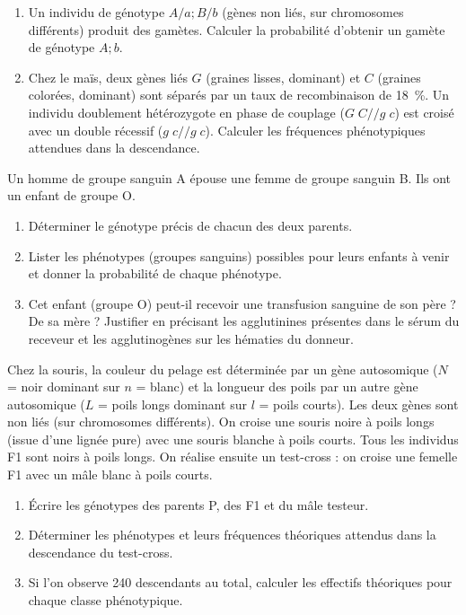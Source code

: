\documentclass[11pt]{article}
\newcommand{\cle}[1]{{\popxbold\color{popdark}#1}}
\newcounter{popsec}
\newcounter{popsub}
\newcommand{\courssub}[1]{%
  \stepcounter{popsub}%
  \par\vspace{9pt}\noindent{\popxbold\fontsize{11.5}{13}\selectfont\color{popink}{\color{poporange}\thepopsec.\thepopsub}\hspace{6pt}#1}\par\nopagebreak\vspace{4pt}
}
\begin{document}
\begin{exercice}
\begin{enumerate}
    \item Un individu de génotype $A/a ; B/b$ (gènes non liés, sur chromosomes différents) produit des gamètes. Calculer la probabilité d'obtenir un gamète de génotype $A ; b$.
    \item Chez le maïs, deux gènes liés $G$ (graines lisses, dominant) et $C$ (graines colorées, dominant) sont séparés par un taux de recombinaison de \SI{18}{\percent}. Un individu doublement hétérozygote en \cle{phase de couplage} ($G\;C // g\;c$) est croisé avec un double récessif ($g\;c // g\;c$). Calculer les fréquences phénotypiques attendues dans la descendance.
\end{enumerate}
\end{exercice}

\courssub{Je m'entraîne}

\begin{exercice}
Un homme de groupe sanguin A épouse une femme de groupe sanguin B. Ils ont un enfant de groupe O.
\begin{enumerate}
    \item Déterminer le génotype précis de chacun des deux parents.
    \item Lister les phénotypes (groupes sanguins) possibles pour leurs enfants à venir et donner la probabilité de chaque phénotype.
    \item Cet enfant (groupe O) peut-il recevoir une transfusion sanguine de son père ? De sa mère ? Justifier en précisant les agglutinines présentes dans le sérum du receveur et les agglutinogènes sur les hématies du donneur.
\end{enumerate}
\end{exercice}

\begin{exercice}
Chez la souris, la couleur du pelage est déterminée par un gène autosomique ($N$ = noir dominant sur $n$ = blanc) et la longueur des poils par un autre gène autosomique ($L$ = poils longs dominant sur $l$ = poils courts). Les deux gènes sont non liés (sur chromosomes différents).
On croise une souris noire à poils longs (issue d'une lignée pure) avec une souris blanche à poils courts. Tous les individus F1 sont noirs à poils longs.
On réalise ensuite un test-cross : on croise une femelle F1 avec un mâle blanc à poils courts.
\begin{enumerate}
    \item Écrire les génotypes des parents P, des F1 et du mâle testeur.
    \item Déterminer les phénotypes et leurs fréquences théoriques attendus dans la descendance du test-cross.
    \item Si l'on observe 240 descendants au total, calculer les effectifs théoriques pour chaque classe phénotypique.
\end{enumerate}
\end{exercice}
\end{document}
